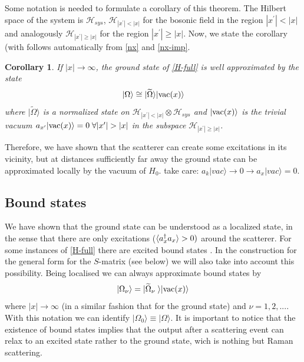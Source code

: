 \documentclass[notitlepage, prx, preprint, amsmath,superscriptaddress,amssymb]{revtex4-1}
\newtheorem{corollary}{Corollary}[section]
\begin{document}
Some notation is needed to formulate a corollary of this theorem.  The Hilbert space of the system is $\mathcal H_{sys}$,  $\mathcal H_{|x^\prime | < |x|} $ for the bosonic field in the region $ |x^\prime | < |x|$ and analogously $\mathcal H_{|x^\prime| \geq  |x| }$ for the region $  |x^\prime | \geq |x|$. 
Now, we state the corollary (with follows automatically from \eqref{nx} and \eqref{nx-imp}.

\begin{corollary}
\label{coro:gs}
If  $|x| \to \infty$, 
the ground state of \eqref{H-full} is  well approximated by the state
\begin{equation}
\label{gs-ansatz}
|\Omega \rangle \cong | \widetilde \Omega \rangle | {\rm vac} (x) \rangle 
\end{equation}
where $\vert \widetilde \Omega \rangle$  is a normalized  state   on $\mathcal H_{|x^\prime| < |x|}  \otimes \mathcal H_{sys}$ and $|{\rm vac} (x) \rangle$ is  the trivial vacuum $a_{x^\prime} | {\rm vac} (x) \rangle=0 \; \forall |x^\prime| > |x|$ in the subspace $\mathcal H_{|x^\prime| \geq |x| }$.
\end{corollary}

Therefore, we have shown that the scatterer can create some excitations in its vicinity, but at distances sufficiently far away the ground state can be approximated locally by the vacuum of $H_0$.
{\color{red} take care: $a_k |vac\rangle \to 0 \to a_x  | vac \rangle =0$}.





\subsection{Bound states}

We have shown that the ground state can be understood as a localized state, in the sense that there are only excitations ($\braket{a_x^\dagger a_x} > 0)$  around the scatterer.   For some instances of \eqref{H-full}  there are excited bound states \cite{}.  In the construction for the general form for the $S$-matrix (see below) we will also take into account   this possibility.  Being localised we can always approximate bound states by 
\begin{equation}
\label{bound}
| \Omega_\nu \rangle = | \widetilde \Omega_\nu  \; \rangle | {\rm vac}(x) \rangle
\end{equation}
where $|x|\to \infty$ (in a similar fashion that for the ground state) and 
 $\nu = 1, 2, ...$. With this notation we can identify $| \Omega_0 \rangle \equiv | \Omega \rangle$.
It is important to notice that the existence of bound states implies that the output after a scattering event can relax to an excited state rather to the ground state, wich is nothing but Raman scattering.
\end{document}
